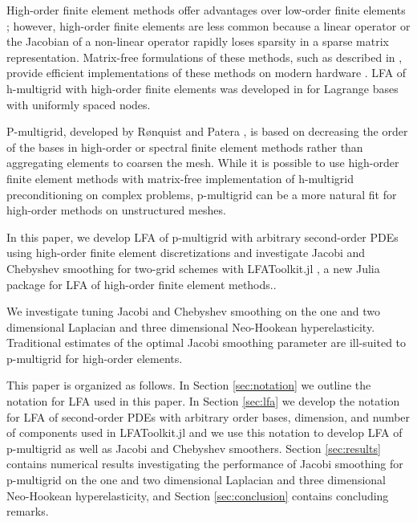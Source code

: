 \documentclass[review]{siamart190516}
\begin{document}
High-order finite element methods offer advantages over low-order finite elements \cite{demkowicz1989toward, oden1989toward, rachowicz1989toward}; however, high-order finite elements are less common because a linear operator or the Jacobian of a non-linear operator rapidly loses sparsity in a sparse matrix representation.
Matrix-free formulations of these methods, such as described in \cite{brown2010efficient, knoll2004jacobian}, provide efficient implementations of these methods on modern hardware \cite{libceed-user-manual, fischer2020scalability}.
LFA of h-multigrid with high-order finite elements was developed in \cite{he2020two} for Lagrange bases with uniformly spaced nodes.

P-multigrid, developed by R{\o}nquist and Patera \cite{ronquist1987spectral}, is based on decreasing the order of the bases in high-order or spectral finite element methods rather than aggregating elements to coarsen the mesh. While it is possible \cite{davydov2019matrix} to use high-order finite element methods with matrix-free implementation of h-multigrid preconditioning on complex problems, p-multigrid can be a more natural fit for high-order methods on unstructured meshes.

In this paper, we develop LFA of p-multigrid with arbitrary second-order PDEs using high-order finite element discretizations and investigate Jacobi and Chebyshev smoothing for two-grid schemes with LFAToolkit.jl \cite{thompson2021toolkit}, a new Julia package for LFA of high-order finite element methods..

We investigate tuning Jacobi and Chebyshev smoothing on the one and two dimensional Laplacian and three dimensional Neo-Hookean hyperelasticity.
Traditional estimates of the optimal Jacobi smoothing parameter are ill-suited to p-multigrid for high-order elements.

This paper is organized as follows.
In Section \ref{sec:notation} we outline the notation for LFA used in this paper.
In Section \ref{sec:lfa} we develop the notation for LFA of second-order PDEs with arbitrary order bases, dimension, and number of components used in LFAToolkit.jl and we use this notation to develop LFA of p-multigrid as well as Jacobi and Chebyshev smoothers.
Section \ref{sec:results} contains numerical results investigating the performance of Jacobi smoothing for p-multigrid on the one and two dimensional Laplacian and three dimensional Neo-Hookean hyperelasticity, and Section \ref{sec:conclusion} contains concluding remarks. 
\end{document}
